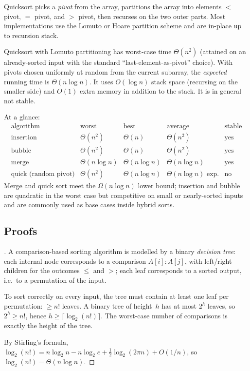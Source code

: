 Quicksort picks a \emph{pivot} from the array, partitions the array
into elements $< $ pivot, $=$ pivot, and $>$ pivot, then recurses on
the two outer parts. Most implementations use the Lomuto or Hoare
partition scheme and are in-place up to recursion stack.

\begin{proposition}
\label{prop:quicksort}
Quicksort with Lomuto partitioning has worst-case time $\Theta(n^2)$
(attained on an already-sorted input with the standard
``last-element-as-pivot'' choice). With pivots chosen uniformly at
random from the current subarray, the \emph{expected} running time is
$\Theta(n \log n)$. It uses $O(\log n)$ stack space (recursing on the
smaller side) and $O(1)$ extra memory in addition to the stack. It
is in general not stable.
\end{proposition}

\begin{remark}
At a glance:
\[
  \begin{array}{l|cccc}
    \text{algorithm} & \text{worst} & \text{best} & \text{average} & \text{stable} \\
    \hline
    \text{insertion}  & \Theta(n^2)   & \Theta(n)         & \Theta(n^2)        & \text{yes} \\
    \text{bubble}     & \Theta(n^2)   & \Theta(n)         & \Theta(n^2)        & \text{yes} \\
    \text{merge}      & \Theta(n \log n) & \Theta(n \log n) & \Theta(n \log n) & \text{yes} \\
    \text{quick (random pivot)} & \Theta(n^2) & \Theta(n \log n) & \Theta(n \log n) \text{ exp.} & \text{no}
  \end{array}
\]
Merge and quick sort meet the $\Omega(n \log n)$ lower bound;
insertion and bubble are quadratic in the worst case but competitive
on small or nearly-sorted inputs and are commonly used as base cases
inside hybrid sorts.
\end{remark}

\subsection*{Proofs}

\begin{proof}[]
A comparison-based sorting algorithm is modelled by a binary
\emph{decision tree}: each internal node corresponds to a comparison
$A[i] : A[j]$, with left/right children for the outcomes
$\leq$ and $>$; each leaf corresponds to a sorted output, i.e.\ to a
permutation of the input.

To sort correctly on every input, the tree must contain at least one
leaf per permutation: $\geq n!$ leaves. A binary tree of height~$h$
has at most $2^h$ leaves, so $2^h \geq n!$, hence
$h \geq \lceil \log_2 (n!) \rceil$. The worst-case number of
comparisons is exactly the height of the tree.

By Stirling's formula, $\log_2(n!) = n \log_2 n - n \log_2 e + \tfrac{1}{2} \log_2(2\pi n) + O(1/n)$,
so $\log_2(n!) = \Theta(n \log n)$.
\end{proof}

